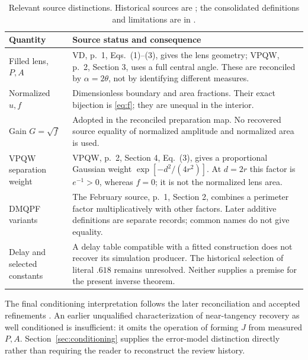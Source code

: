 \documentclass[11pt,a4paper]{article}
\theoremstyle{definition}
\begin{document}
\begin{table}[htbp]
\centering\small
\begin{tabular}{@{}>{\raggedright\arraybackslash}p{.22\linewidth}>{\raggedright\arraybackslash}p{.7\linewidth}@{}}
\toprule
Quantity & Source status and consequence\\
\midrule
Filled lens, \(P,A\) & VD, p.~1, Eqs.~(1)--(3), gives the lens geometry; VPQW, p.~2, Section 3, uses a full central angle. These are reconciled by \(\alpha=2\theta\), not by identifying different measures.\\[4pt]
Normalized \(u,f\) & Dimensionless boundary and area fractions. Their exact bijection is \eqref{eq:f}; they are unequal in the interior.\\[4pt]
Gain \(G=\sqrt f\) & Adopted in the reconciled preparation map. No recovered source equality of normalized amplitude and normalized area is used.\\[4pt]
VPQW separation weight & VPQW, p.~2, Section 4, Eq.~(3), gives a proportional Gaussian weight \(\exp[-d^2/(4r^2)]\). At \(d=2r\) this factor is \(e^{-1}>0\), whereas \(f=0\); it is not the normalized lens area.\\[4pt]
DMQPF variants & The February source, p.~1, Section 2, combines a perimeter factor multiplicatively with other factors. Later additive definitions are separate records; common names do not give equality.\\[4pt]
Delay and selected constants & A delay table compatible with a fitted construction does not recover its simulation producer. The historical selection of literal \(.618\) remains unresolved. Neither supplies a premise for the present inverse theorem.\\
\bottomrule
\end{tabular}
\caption{Relevant source distinctions. Historical sources are \citet{vd,vpqw,dmqpf}; the consolidated definitions and limitations are in \citet[Sections 1--7]{dmqpfref}.}
\end{table}

The final conditioning interpretation follows the later reconciliation
\citep[Section 3]{toroidaddendum} and accepted refinements
\citep[R6]{refinements}. An earlier unqualified characterization of near-tangency recovery as well conditioned is insufficient: it omits the operation of forming \(J\) from measured \(P,A\). Section~\ref{sec:conditioning} supplies the error-model distinction directly rather than requiring the reader to reconstruct the review history.
\end{document}
